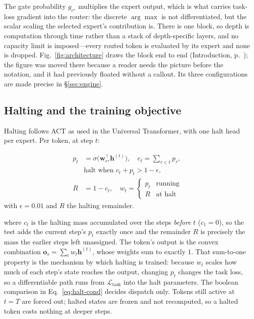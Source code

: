 The gate probability $g_{e^\star}$ multiplies the expert output, which is what
carries task-loss gradient into the router: the discrete $\arg\max$ is not
differentiated, but the scalar scaling the selected expert's contribution is.
There is one block, so depth is computation through time rather than a stack of
depth-specific layers, and no capacity limit is imposed---every routed token is
evaluated by its expert and none is dropped. Fig.~\ref{fig:architecture} draws
the block end to end (Introduction, p.~\pageref{fig:architecture}); the figure
was moved there because a reader needs the picture before the notation, and it
had previously floated without a callout. Its three configurations are made
precise in \S\ref{sec:engine}.

\subsection{Halting and the training objective}
\label{sec:halting-method}

Halting follows ACT \citep{graves2016act} as used in the Universal Transformer,
with one halt head per expert. Per token, at step $t$:

{\dispsize
\begin{align}
p_t &= \sigma\big(\mathbf{w}_{e^\star}^{\!\top}\mathbf{h}^{(t)}\big),
  \quad c_t = \textstyle\sum_{\tau < t} p_\tau , \label{eq:halt-p} \\[2pt]
&\text{halt when } c_t + p_t > 1 - \epsilon , \label{eq:halt-cond} \\[2pt]
R &= 1 - c_t , \quad
  w_t = \begin{cases} p_t & \text{running} \\ R & \text{at halt} \end{cases}
  \label{eq:halt-w}
\end{align}
}
with $\epsilon = 0.01$ and $R$ the halting remainder.

where $c_t$ is the halting mass accumulated over the steps \emph{before} $t$
($c_1 = 0$), so the test adds the current step's $p_t$ exactly once and the
remainder $R$ is precisely the mass the earlier steps left unassigned. The token's
output is the convex combination
$\mathbf{o}_s = \sum_t w_t \mathbf{h}^{(t)}$, whose weights sum to exactly $1$.
That sum-to-one property is the mechanism by which halting is trained: because
$w_t$ scales how much of each step's state reaches the output, changing $p_t$
changes the task loss, so a differentiable path runs from $\mathcal{L}_{\text{task}}$
into the halt parameters. The boolean comparison in
Eq.~\ref{eq:halt-cond} decides dispatch only. Tokens still active at $t=T$ are
forced out; halted states are frozen and not recomputed, so a halted token costs
nothing at deeper steps.

